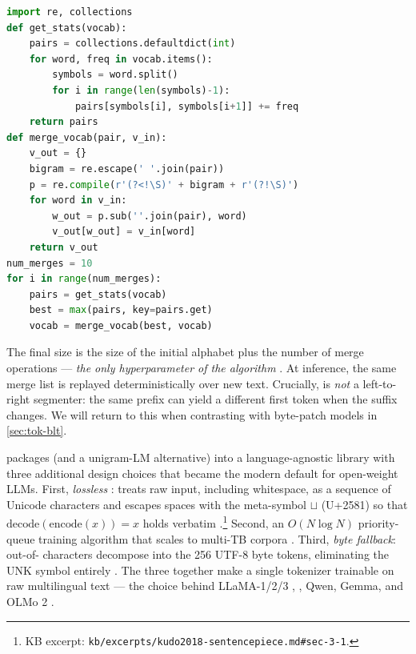 \begin{lstlisting}[language=Python, caption={BPE training (Sennrich et al.\ 2016, \S 3.2)}, label=lst:bpe]
import re, collections
def get_stats(vocab):
    pairs = collections.defaultdict(int)
    for word, freq in vocab.items():
        symbols = word.split()
        for i in range(len(symbols)-1):
            pairs[symbols[i], symbols[i+1]] += freq
    return pairs
def merge_vocab(pair, v_in):
    v_out = {}
    bigram = re.escape(' '.join(pair))
    p = re.compile(r'(?<!\S)' + bigram + r'(?!\S)')
    for word in v_in:
        w_out = p.sub(''.join(pair), word)
        v_out[w_out] = v_in[word]
    return v_out
num_merges = 10
for i in range(num_merges):
    pairs = get_stats(vocab)
    best = max(pairs, key=pairs.get)
    vocab = merge_vocab(best, vocab)
\end{lstlisting}

The final  size is the size of the initial alphabet plus the
number of merge operations — \emph{the only hyperparameter of the
algorithm} \citep[\S 3.2]{sennrich2016}. At inference, the same merge
list is replayed deterministically over new text. Crucially,  is
\emph{not} a left-to-right segmenter: the same prefix can yield a
different first token when the suffix changes. We will return to this
when contrasting with byte-patch models in \cref{sec:tok-blt}.

\citet{kudo2018-sentencepiece} packages  (and a unigram-LM
alternative) into a language-agnostic library with three additional
design choices that became the modern default for open-weight LLMs.
First, \emph{lossless }:  treats raw input,
including whitespace, as a sequence of Unicode characters and escapes
spaces with the meta-symbol $\sqcup$ (U+2581) so that
$\mathrm{decode}(\mathrm{encode}(x)) = x$ holds verbatim
\citep[\S 3.1]{kudo2018-sentencepiece}.\footnote{KB excerpt:
\texttt{kb/excerpts/kudo2018-sentencepiece.md\#sec-3-1}.} Second, an
$O(N \log N)$ priority-queue training algorithm that scales to multi-TB
corpora \citep[\S 3.2]{kudo2018-sentencepiece}. Third, \emph{byte
fallback}: out-of- characters decompose into the 256 UTF-8
byte tokens, eliminating the UNK symbol entirely
\citep[\S byte-fallback]{kudo2018-sentencepiece}. The three together
make a single tokenizer trainable on raw multilingual text — the choice
behind LLaMA-1/2/3 \citep{touvron2023, meta-llama3}, , Qwen,
Gemma, and OLMo 2 \citep{olmo2}.

